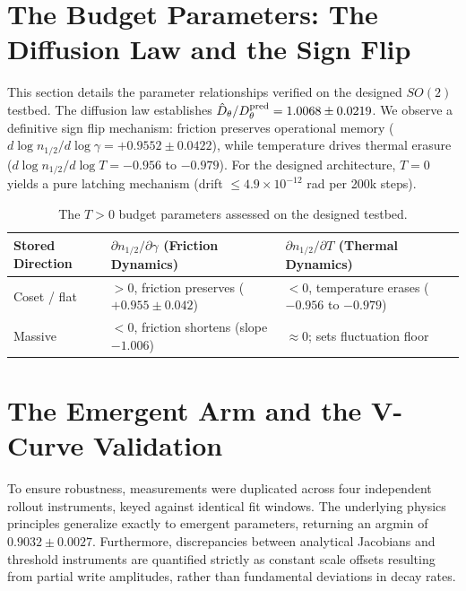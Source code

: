 \documentclass{article}
\begin{document}
\section{The Budget Parameters: The Diffusion Law and the Sign Flip}\label{app:budget}

This section details the parameter relationships verified on the designed $SO(2)$ testbed. The diffusion law establishes $\hat D_\theta/D_\theta^{\rm pred}=1.0068\pm0.0219$. We observe a definitive sign flip mechanism: friction preserves operational memory ($d\log n_{1/2}/d\log\gamma=+0.9552\pm0.0422$), while temperature drives thermal erasure ($d\log n_{1/2}/d\log T=-0.956$ to $-0.979$). For the designed architecture, $T=0$ yields a pure latching mechanism (drift $\le4.9\times10^{-12}$ rad per 200k steps).

\begin{table}[!htb]\centering\small
\caption{The $T>0$ budget parameters assessed on the designed testbed.}
\begin{tabular}{lll}
\toprule
Stored Direction & $\partial n_{1/2}/\partial\gamma$ (Friction Dynamics) & $\partial n_{1/2}/\partial T$ (Thermal Dynamics)\\
\midrule
Coset / flat & $>0$, friction preserves ($+0.955\pm0.042$) & $<0$, temperature erases ($-0.956$ to $-0.979$)\\
Massive & $<0$, friction shortens (slope $-1.006$) & $\approx0$; sets fluctuation floor\\
\bottomrule
\end{tabular}
\end{table}

\section{The Emergent Arm and the V-Curve Validation}\label{app:emergent}

To ensure robustness, measurements were duplicated across four independent rollout instruments, keyed against identical fit windows. The underlying physics principles generalize exactly to emergent parameters, returning an argmin of $0.9032\pm0.0027$. Furthermore, discrepancies between analytical Jacobians and threshold instruments are quantified strictly as constant scale offsets resulting from partial write amplitudes, rather than fundamental deviations in decay rates.
\end{document}
